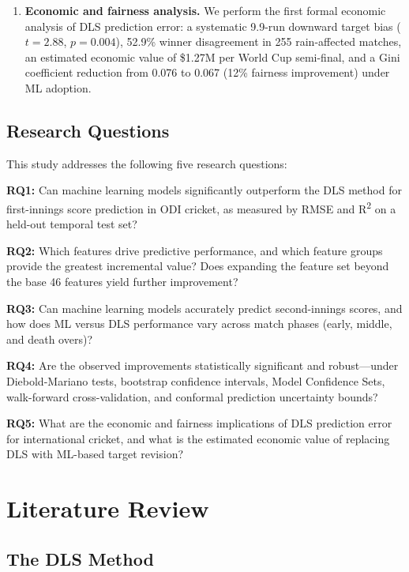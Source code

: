 \documentclass[10pt,a4paper,twocolumn]{article}
\begin{document}
\begin{enumerate}[leftmargin=1.2em,label=\arabic*.,itemsep=2pt]
\item \textbf{Economic and fairness analysis.} We perform the first formal economic analysis of DLS prediction error: a systematic 9.9-run downward target bias ($t=2.88$, $p=0.004$), 52.9\% winner disagreement in 255 rain-affected matches, an estimated economic value of \$1.27M per World Cup semi-final, and a Gini coefficient reduction from 0.076 to 0.067 (12\% fairness improvement) under ML adoption.
\end{enumerate}

\subsection{Research Questions}

This study addresses the following five research questions:

\textbf{RQ1:} Can machine learning models significantly outperform the DLS method for first-innings score prediction in ODI cricket, as measured by RMSE and R\textsuperscript{2} on a held-out temporal test set?

\textbf{RQ2:} Which features drive predictive performance, and which feature groups provide the greatest incremental value? Does expanding the feature set beyond the base 46 features yield further improvement?

\textbf{RQ3:} Can machine learning models accurately predict second-innings scores, and how does ML versus DLS performance vary across match phases (early, middle, and death overs)?

\textbf{RQ4:} Are the observed improvements statistically significant and robust---under Diebold-Mariano tests, bootstrap confidence intervals, Model Confidence Sets, walk-forward cross-validation, and conformal prediction uncertainty bounds?

\textbf{RQ5:} What are the economic and fairness implications of DLS prediction error for international cricket, and what is the estimated economic value of replacing DLS with ML-based target revision?

\section{Literature Review}
\label{sec:lit}

\subsection{The DLS Method}
\end{document}
